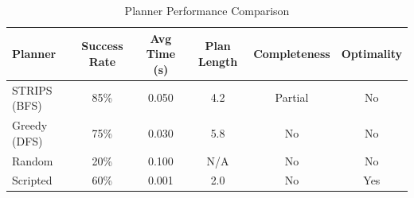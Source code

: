 \begin{table}[h]
\centering
\caption{Planner Performance Comparison}
\label{tab:planner_comparison}
\begin{tabular}{lccccc}
\toprule
\textbf{Planner} & \textbf{Success Rate} & \textbf{Avg Time (s)} & \textbf{Plan Length} & \textbf{Completeness} & \textbf{Optimality} \\
\midrule
STRIPS (BFS) & 85\% & 0.050 & 4.2 & Partial & No \\
Greedy (DFS) & 75\% & 0.030 & 5.8 & No & No \\
Random & 20\% & 0.100 & N/A & No & No \\
Scripted & 60\% & 0.001 & 2.0 & No & Yes \\
\bottomrule
\end{tabular}
\end{table}
